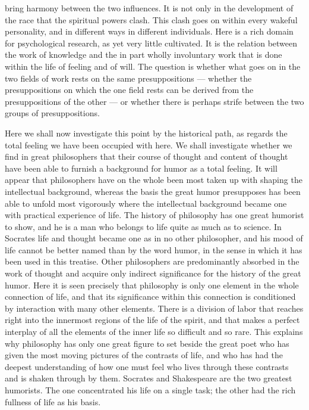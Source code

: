 \documentclass[12pt]{book}
\newcommand{\opage}[1]{\marginnote{\footnotesize\textit{[#1]}}}
\begin{document}
bring harmony between the two influences. It is not only in the development of the race that
the spiritual powers clash. This clash goes on within every wakeful personality, and in
different ways in different individuals. Here is a rich domain for psychological research, as
yet very little cultivated. It is the relation between the work of knowledge and the in part
wholly involuntary work that is done within the life of feeling and of will. The question is
whether what goes on in the two fields of work rests on the same presuppositions --- whether
the presuppositions on which the one field rests can be derived from the presuppositions of the
other --- or whether there is perhaps strife between the two groups of presuppositions.

Here we shall now investigate this point by the historical path, as regards the total feeling
we have been occupied with here. We shall investigate whether we find in great philosophers
that their course of thought and content of thought have been able to furnish a background for
humor as a total feeling. It will appear that philosophers have on the whole been most taken up
with shaping the intellectual background, whereas the basis the great humor presupposes has been
able to unfold most vigorously where the intellectual background became one with practical
experience of life. The history of philosophy has one great humorist to show, and he is a man
who belongs to life quite as much as to science. In Socrates life and thought became one as in
no other philosopher, and his mood of life cannot be better named than by the word humor, in the
sense in which it has been used in this treatise. Other philosophers are predominantly absorbed
in the work of thought and acquire only indirect significance for the history of the great
humor. Here it is seen precisely that philosophy is only one element in the whole connection of
life, and that its significance within this connection is conditioned by interaction with many
other elements. There is a division of labor that reaches right into the innermost regions of
the life of the spirit, and that makes a perfect interplay of all the elements of the inner life
so difficult and so rare. This explains why philosophy has only one great figure to set beside
the great \opage{147}poet who has given the most moving pictures of the contrasts of life, and
who has had the deepest understanding of how one must feel who lives through these contrasts and
is shaken through by them. Socrates and Shakespeare are the two greatest humorists. The one
concentrated his life on a single task; the other had the rich fullness of life as his basis.
\end{document}
